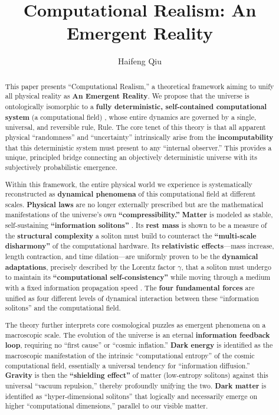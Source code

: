 \documentclass[11pt, a4paper]{article}
\title{\textbf{Computational Realism: An Emergent Reality}}
\author{Haifeng Qiu}
\date{} %
\begin{document}
\maketitle

\begin{abstract}
This paper presents ``Computational Realism,'' a theoretical framework aiming to unify all physical reality as \textbf{An Emergent Reality}. We propose that the universe is ontologically isomorphic to a \textbf{fully deterministic, self-contained computational system} (a computational field) \cite{Wolfram2002}, whose entire dynamics are governed by a single, universal, and reversible rule, Rule. The core tenet of this theory is that all apparent physical ``randomness'' and ``uncertainty'' intrinsically arise from the \textbf{incomputability} \cite{Turing1936} that this deterministic system must present to any ``internal observer.'' This provides a unique, principled bridge connecting an objectively deterministic universe with its subjectively probabilistic emergence.

Within this framework, the entire physical world we experience is systematically reconstructed as \textbf{dynamical phenomena} of this computational field at different scales. \textbf{Physical laws} are no longer externally prescribed but are the mathematical manifestations of the universe's own \textbf{``compressibility.''} \textbf{Matter} is modeled as stable, self-sustaining \textbf{``information solitons''} \cite{DrazinJohnson1989, Skyrme1961}. Its \textbf{rest mass} is shown to be a measure of the \textbf{structural complexity} a soliton must build to counteract the \textbf{``multi-scale disharmony''} of the computational hardware. Its \textbf{relativistic effects}—mass increase, length contraction, and time dilation—are uniformly proven to be the \textbf{dynamical adaptations}, precisely described by the Lorentz factor $\gamma$, that a soliton must undergo to maintain its \textbf{``computational self-consistency''} while moving through a medium with a fixed information propagation speed \cite{Einstein1905}. The \textbf{four fundamental forces} are unified as four different levels of dynamical interaction between these ``information solitons'' and the computational field.

The theory further interprets core cosmological puzzles as emergent phenomena on a macroscopic scale. The evolution of the universe is an eternal \textbf{information feedback loop}, requiring no ``first cause'' or ``cosmic inflation.'' \textbf{Dark energy} is identified as the macroscopic manifestation of the intrinsic ``computational entropy'' of the cosmic computational field, essentially a universal tendency for ``information diffusion.'' \textbf{Gravity} is then the \textbf{``shielding effect''} of matter (low-entropy solitons) against this universal ``vacuum repulsion,'' thereby profoundly unifying the two. \textbf{Dark matter} is identified as ``hyper-dimensional solitons'' that logically and necessarily emerge on higher ``computational dimensions,'' parallel to our visible matter.


\end{abstract}
\end{document}
